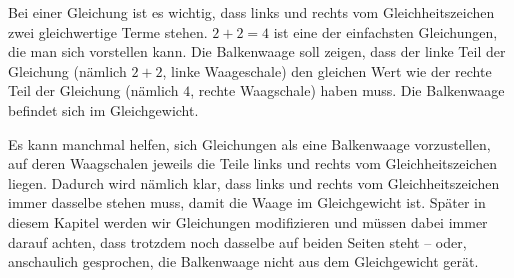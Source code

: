 \documentclass[../../main.tex]{subfiles}
\begin{document}
Bei einer Gleichung ist es wichtig, dass links und rechts vom Gleichheitszeichen zwei gleichwertige Terme stehen. $2+2=4$ ist eine der einfachsten Gleichungen, die man sich vorstellen kann. Die Balkenwaage soll zeigen, dass der linke Teil der Gleichung (nämlich $2+2$, linke Waageschale) den gleichen Wert wie der rechte Teil der Gleichung (nämlich $4$, rechte Waagschale) haben muss. Die Balkenwaage befindet sich im Gleichgewicht.

Es kann manchmal helfen, sich Gleichungen als eine Balkenwaage vorzustellen, auf deren Waagschalen jeweils die Teile links und rechts vom Gleichheitszeichen liegen. Dadurch wird nämlich klar, dass links und rechts vom Gleichheitszeichen immer dasselbe stehen muss, damit die Waage im Gleichgewicht ist. Später in diesem Kapitel werden wir Gleichungen modifizieren und müssen dabei immer darauf achten, dass trotzdem noch dasselbe auf beiden Seiten steht -- oder, anschaulich gesprochen, die Balkenwaage nicht aus dem Gleichgewicht gerät.
\end{document}
